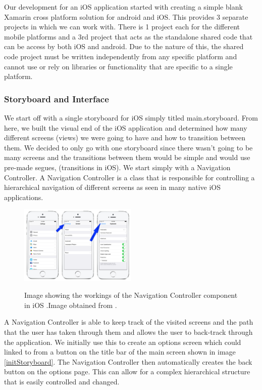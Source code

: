 \documentclass[main.tex]{subfiles}
\begin{document}
Our development for an iOS application started with creating a simple blank Xamarin cross platform solution for android and iOS. This provides 3 separate projects in which we can work with. There is 1 project each for the different mobile platforms and a 3rd project that acts as the standalone shared code that can be access by both iOS and android. Due to the nature of this, the shared code project must be written independently from any specific platform and cannot use or rely on libraries or functionality that are specific to a single platform.

\subsubsection{Storyboard and Interface}
We start off with a single storyboard for iOS simply titled main.storyboard. From here, we built the visual end of the iOS application and determined how many different screens (views) we were going to have and how to transition between them. We decided to only go with one storyboard since there wasn’t going to be many screens and the transitions between them would be simple and would use pre-made segues, (transitions in iOS). We start simply with a Navigation Controller. A Navigation Controller is a class that is responsible for controlling a hierarchical navigation of different screens as seen in many native iOS applications.

\begin{figure}[H]
\centering
\includegraphics[width=0.5\textwidth]{images-implementation/NavigationController.png}
\label{NavigationController}
\caption{Image showing the workings of the Navigation Controller component in iOS .Image obtained from \cite{iosnavigxtioncontroller}.}
\end{figure}

A Navigation Controller is able to keep track of the visited screens and the path that the user has taken through them and allows the user to back-track through the application. We initially use this to create an options screen which could linked to from a button on the title bar of the main screen shown in image \ref{initStoryboard}. The Navigation Controller then automatically creates the back button on the options page. This can allow for a complex hierarchical structure that is easily controlled and changed.
\end{document}

